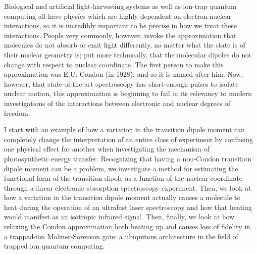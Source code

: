 
Biological and artificial light-harvesting systems as well as ion-trap quantum computing all have physics which are highly dependent on electron-nuclear interactions, so it is incredibly important to be precise in how we treat these interactions.  People very commonly, however, invoke the approximation that molecules do not absorb or emit light differently, no matter what the state is of their nuclear geometry is; put more technically, that the molecular dipoles do not change with respect to nuclear coordinate.  The first person to make this approximation was E.U. Condon (in 1928), and so it is named after him.  Now, however, that state-of-the-art spectroscopy has short-enough pulses to isolate nuclear motion, this approximation is beginning to fail in its relevancy to modern investigations of the interactions between electronic and nuclear degrees of freedom.

I start with an example of how a variation in the transition dipole moment can completely change the interpretation of an entire class of experiment by confusing one physical effect for another when investigating the mechanism of photosynthetic energy transfer.  Recognizing that having a non-Condon transition dipole moment can be a problem, we investigate a method for estimating the functional form of the transition dipole as a function of the nuclear coordinate through a linear electronic absorption spectroscopy experiment.  Then, we look at how a variation in the transition dipole moment actually causes a molecule to heat during the operation of an ultrafast laser spectroscopy and how that heating would manifest as an isotropic infrared signal.  Then, finally, we look at how relaxing the Condon approximation both heating up and causes loss of fidelity in a trapped-ion Molmer-Sorenson gate: a ubiquitous architecture in the field of trapped ion quantum computing.
